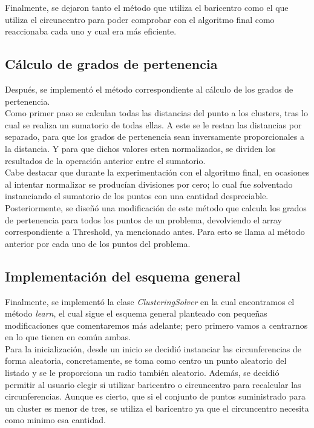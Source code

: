 \documentclass[conference,a4paper]{IEEEtran}
\begin{document}
Finalmente, se dejaron tanto el método que utiliza el baricentro como el que utiliza el circuncentro para poder comprobar con el algoritmo final como reaccionaba cada uno y cual era más eficiente.\\

\subsection{Cálculo de grados de pertenencia}

Después, se implementó el método correspondiente al cálculo de los grados de pertenencia.\\

Como primer paso se calculan todas las distancias del punto a los clusters, tras lo cual se realiza un sumatorio de todas ellas. A este se le restan las distancias por separado, para que los grados de pertenencia sean inversamente proporcionales a la distancia. Y para que dichos valores esten normalizados, se dividen los resultados de la operación anterior entre el sumatorio.\\

Cabe destacar que durante la experimentación con el algoritmo final, en ocasiones al intentar normalizar se producían divisiones por cero; lo cual fue solventado instanciando el sumatorio de los puntos con una cantidad despreciable.\\

Posteriormente, se diseñó una modificación de este método que calcula los grados de pertenencia para todos los puntos de un problema, devolviendo el array correspondiente a Threshold, ya mencionado antes. Para esto se llama al método anterior por cada uno de los puntos del problema.\\

\subsection{Implementación del esquema general}

Finalmente, se implementó la clase \textit{ClusteringSolver} en la cual encontramos el método \textit{learn}, el cual sigue el esquema general planteado con pequeñas modificaciones que comentaremos más adelante; pero primero vamos a centrarnos en lo que tienen en común ambas.\\

Para la inicialización, desde un inicio se decidió instanciar las circunferencias de forma aleatoria, concretamente, se toma como centro un punto aleatorio del listado y se le proporciona un radio también aleatorio. Además, se decidió permitir al usuario elegir si utilizar baricentro o circuncentro para recalcular las circunferencias. Aunque es cierto, que si el conjunto de puntos suministrado para un cluster es menor de tres, se utiliza el baricentro ya que el circuncentro necesita como minimo esa cantidad.\\
\end{document}
